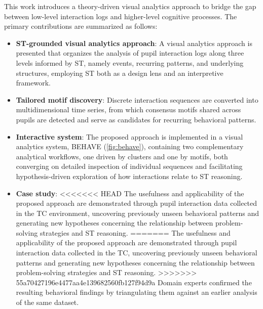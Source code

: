 This work introduces a theory-driven visual analytics approach to bridge the gap between low-level interaction logs and higher-level cognitive processes.
The primary contributions are summarized as follows:
\begin{itemize}
    \item 
    \textbf{ST-grounded visual analytics approach}:
    A visual analytics approach is presented that organizes the analysis of pupil interaction logs along three levels informed by ST, namely events, recurring patterns, and underlying structures, employing ST both as a design lens and an interpretive framework.

    \item 
    \textbf{Tailored motif discovery}:
    Discrete interaction sequences are converted into multidimensional time series, from which consensus motifs shared across pupils are detected and serve as candidates for recurring behavioral patterns.

    \item
    \textbf{Interactive system}:
    The proposed approach is implemented in a visual analytics system, \textsc{BEHAVE} (\cref{fig:behave}), containing two complementary analytical workflows, one driven by clusters and one by motifs, both converging on detailed inspection of individual sequences and facilitating hypothesis-driven exploration of how interactions relate to ST reasoning.

    \item 
    \textbf{Case study}:
<<<<<<< HEAD
    The usefulness and applicability of the proposed approach are demonstrated through pupil interaction data collected in the TC environment, uncovering previously unseen behavioral patterns and generating new hypotheses concerning the relationship between problem-solving strategies and ST reasoning.
=======
    The usefulness and applicability of the proposed approach are demonstrated through pupil interaction data collected in the TC, uncovering previously unseen behavioral patterns and generating new hypotheses concerning the relationship between problem-solving strategies and ST reasoning.
>>>>>>> 55a70427196e4477aa4e139682560fb127f94d9a
    Domain experts confirmed the resulting behavioral findings by triangulating them against an earlier analysis of the same dataset.
\end{itemize}

